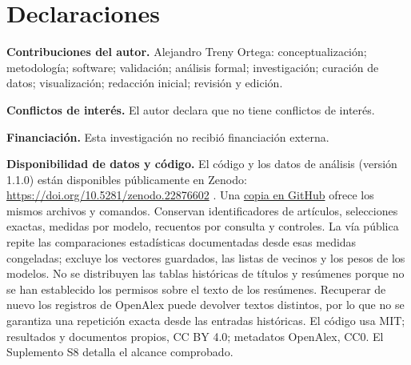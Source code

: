 \documentclass[12pt]{article}
\begin{document}
\section*{Declaraciones}
\textbf{Contribuciones del autor.}
Alejandro Treny Ortega: conceptualización; metodología; software; validación; análisis formal; investigación; curación de datos; visualización; redacción inicial; revisión y edición.
\par\medskip
\textbf{Conflictos de interés.}
El autor declara que no tiene conflictos de interés.
\par\medskip
\textbf{Financiación.}
Esta investigación no recibió financiación externa.
\par\medskip
\textbf{Disponibilidad de datos y código.}
El código y los datos de análisis (versión 1.1.0) están disponibles públicamente en Zenodo: \url{https://doi.org/10.5281/zenodo.22876602} \citep{treny2026reproduction}. Una \href{https://github.com/aleetreny/Shape-of-Science-Reproducibility}{copia en GitHub} ofrece los mismos archivos y comandos. Conservan identificadores de artículos, selecciones exactas, medidas por modelo, recuentos por consulta y controles. La vía pública repite las comparaciones estadísticas documentadas desde esas medidas congeladas; excluye los vectores guardados, las listas de vecinos y los pesos de los modelos. No se distribuyen las tablas históricas de títulos y resúmenes porque no se han establecido los permisos sobre el texto de los resúmenes. Recuperar de nuevo los registros de OpenAlex puede devolver textos distintos, por lo que no se garantiza una repetición exacta desde las entradas históricas. El código usa MIT; resultados y documentos propios, CC BY 4.0; metadatos OpenAlex, CC0. El Suplemento S8 detalla el alcance comprobado.


\begingroup
{}


\endgroup
\end{document}
